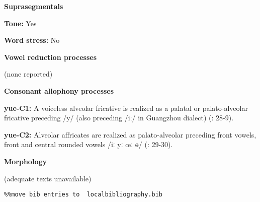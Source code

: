 \textbf{Suprasegmentals}



\textbf{Tone:} Yes



\textbf{Word stress:} No



\textbf{Vowel reduction processes}



(none reported)



\textbf{Consonant allophony processes}



\textbf{yue-C1:} A voiceless alveolar fricative is realized as a palatal or palato-alveolar fricative preceding /y/ (also preceding /iː/ in Guangzhou dialect) (\citealt{BauerBenedict1997}: 28-9).



\textbf{yue-C2:} Alveolar affricates are realized as palato-alveolar preceding front vowels, front and central rounded vowels /iː yː œː ɵ/ (\citealt{BauerBenedict1997}: 29-30).



\textbf{Morphology}



(adequate texts unavailable)


\begin{verbatim}%%move bib entries to  localbibliography.bib
\end{verbatim}
